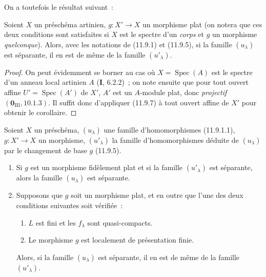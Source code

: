 On a toutefois le résultat suivant~:

\begin{corollary}[11.9.9]
\label{IV.11.9.9-fr}
Soient $X$ un préschéma \textup{artinien}, $g:X'\to X$ un morphisme \textup{plat (on notera que
ces deux conditions sont satisfaites si $X$ est le spectre d'un \emph{corps}
et $g$ un morphisme \emph{quelconque})}. Alors, avec les notations de \textup{(11.9.1)}
et \textup{(11.9.5)}, si la famille $(u_\lambda)$ est séparante, il en est de même de la
famille $(u'_\lambda)$.
\end{corollary}

\begin{proof}
On peut évidemment se borner au cas où $X=\operatorname{Spec}(A)$ est le
spectre d'un anneau local artinien $A$ (\textbf I, 6.2.2)~; on note ensuite que
pour tout ouvert affine $U'=\operatorname{Spec}(A')$ de $X'$, $A'$ est un
$A$-module plat, donc \emph{projectif} $(\mathbf 0_{\mathrm{III}},10.1.3)$.
Il suffit donc d'appliquer (11.9.7) à tout ouvert affine de $X'$ pour obtenir
le corollaire.
\end{proof}

\begin{theorem}[11.9.10]
\label{IV.11.9.10-fr}
Soient $X$ un préschéma, $(u_\lambda)$ une famille d'homomorphismes
\textup{(11.9.1.1)}, $g:X'\to X$ un morphisme, $(u'_\lambda)$ la famille
d'homomorphismes déduite de $(u_\lambda)$ par le changement de base $g$
\textup{(11.9.5)}.
\begin{enumerate}[label=\textup{(\roman*)}]
  \item Si $g$ est un morphisme fidèlement plat et si la famille
  $(u'_\lambda)$ est séparante, alors la famille $(u_\lambda)$ est séparante.
  \item Supposons que $g$ soit un morphisme plat, et en outre que \textup{l'une} des
  deux conditions suivantes soit vérifiée~:
  \begin{enumerate}[label=\emph{\alph*)}]
    \item $L$ est fini et les $f_\lambda$ sont quasi-compacts.
    \item Le morphisme $g$ est localement de présentation finie.
  \end{enumerate}
  Alors, si la famille $(u_\lambda)$ est séparante, il en est de même de la
  famille $(u'_\lambda)$.
\end{enumerate}
\end{theorem}


